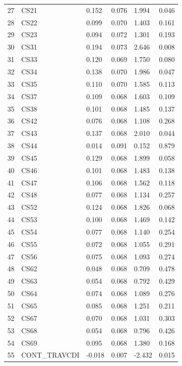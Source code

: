 \begin{table}[ht]
\begin{tabular}{rlllll}
  27 & CS21 & 0.152 & 0.076 & 1.994 & 0.046 \\ 
  28 & CS22 & 0.099 & 0.070 & 1.403 & 0.161 \\ 
  29 & CS23 & 0.094 & 0.072 & 1.301 & 0.193 \\ 
  30 & CS31 & 0.194 & 0.073 & 2.646 & 0.008 \\ 
  31 & CS33 & 0.120 & 0.069 & 1.750 & 0.080 \\ 
  32 & CS34 & 0.138 & 0.070 & 1.986 & 0.047 \\ 
  33 & CS35 & 0.110 & 0.070 & 1.585 & 0.113 \\ 
  34 & CS37 & 0.109 & 0.068 & 1.603 & 0.109 \\ 
  35 & CS38 & 0.101 & 0.068 & 1.485 & 0.137 \\ 
  36 & CS42 & 0.076 & 0.068 & 1.108 & 0.268 \\ 
  37 & CS43 & 0.137 & 0.068 & 2.010 & 0.044 \\ 
  38 & CS44 & 0.014 & 0.091 & 0.152 & 0.879 \\ 
  39 & CS45 & 0.129 & 0.068 & 1.899 & 0.058 \\ 
  40 & CS46 & 0.101 & 0.068 & 1.483 & 0.138 \\ 
  41 & CS47 & 0.106 & 0.068 & 1.562 & 0.118 \\ 
  42 & CS48 & 0.077 & 0.068 & 1.134 & 0.257 \\ 
  43 & CS52 & 0.124 & 0.068 & 1.826 & 0.068 \\ 
  44 & CS53 & 0.100 & 0.068 & 1.469 & 0.142 \\ 
  45 & CS54 & 0.077 & 0.068 & 1.140 & 0.254 \\ 
  46 & CS55 & 0.072 & 0.068 & 1.055 & 0.291 \\ 
  47 & CS56 & 0.075 & 0.068 & 1.093 & 0.274 \\ 
  48 & CS62 & 0.048 & 0.068 & 0.709 & 0.478 \\ 
  49 & CS63 & 0.054 & 0.068 & 0.792 & 0.429 \\ 
  50 & CS64 & 0.074 & 0.068 & 1.089 & 0.276 \\ 
  51 & CS65 & 0.085 & 0.068 & 1.251 & 0.211 \\ 
  52 & CS67 & 0.070 & 0.068 & 1.031 & 0.303 \\ 
  53 & CS68 & 0.054 & 0.068 & 0.796 & 0.426 \\ 
  54 & CS69 & 0.095 & 0.068 & 1.380 & 0.168 \\ 
  55 & CONT_TRAVCDI & -0.018 & 0.007 & -2.432 & 0.015 \\ 
   \bottomrule
\end{tabular}
\end{table}
